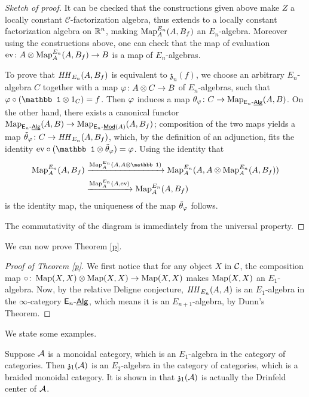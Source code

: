 \documentclass[twoside]{article}
\begin{document}
\begin{proof}[Sketch of proof]
    It can be checked that the constructions given above make $Z$ a 
    locally constant $\mathscr C$-factorization algebra, thus extends to a locally
    constant factorization algebra on $\mathbb{R}^n$, making $\operatorname{Map}_A^{E_n}(A,B_f)$ an
    $E_n$-algebra. Moreover using the constructions above,
    one can check that the map of evaluation
    $\mathrm{ev}\colon A\otimes\operatorname{Map}_A^{E_n}(A,B_f)\to B$ is a map of $E_n$-algebras.

    To prove that $\mathit{HH}_{E_n}(A,B_f)$ is equivalent to $\mathfrak z_n(f)$, we choose
    an arbitrary $E_n$-algebra $C$ together with a map $\varphi\colon A\otimes C\to B$ of 
    $E_n$-algebras, such that $\vp\circ(\mathbb1\ox 1_{C})=f$. Then $\varphi$
    induces a map $\theta_\varphi\colon C\to\operatorname{Map}_{\mathsf{E}_n\text{-}\underline{\smash{\mathsf{Alg}}}}(A,B)$. On the other hand, there
    exists a canonical functor $\operatorname{Map}_{\mathsf{E}_n\text{-}\underline{\smash{\mathsf{Alg}}}}(A,B)\to
    \operatorname{Map}_{\mathsf{E}_n\text{-}\underline{\smash{\mathsf{Mod}}}(A)}(A,B_f)$; composition of the two maps yields a map 
    $\tilde\theta_\varphi\colon C\to\mathit{HH}_{E_n}(A,B_f)$, which, by the definition of
    an adjunction, fits the identity $\mathrm{ev}\circ(\mathbb1\ox\tilde\theta_\vp)
    =\vp$. Using the identity that $$\begin{aligned}\Map_A^{E_n}(A,B_f)
    &\xrightarrow{\Map_A^{E_n}(A,A\ox\mathbb1)}
    \Map_A^{E_n}(A,A\ox\Map_A^{E_n}(A,B_f))\\&\xrightarrow{\Map_A^{E_n}(A,\mathrm{ev})}
    \Map_A^{E_n}(A,B_f)\end{aligned}$$ is the identity map, the uniqueness of the map
    $\tilde\theta_\varphi$ follows.

    The commutativity of the diagram is immediately from the universal property.
\end{proof}

We can now prove Theorem \ref{p}.

\begin{proof}[Proof of Theorem \ref{p}]
    We first notice that for any object $X$ in $\cal C$, the composition map
    $\circ\colon\operatorname{Map}(X,X)\otimes\operatorname{Map}(X,X)\to\operatorname{Map}(X,X)$
    makes $\operatorname{Map}(X,X)$ an $E_1$-algebra. Now, by the relative Deligne conjecture,
    $\mathit{HH}_{E_n}(A,A)$ is an $E_1$-algebra in the $\infty$-category $\mathsf{E}_n\text{-}\underline{\smash{\mathsf{Alg}}}$,
    which means it is an $E_{n+1}$-algebra, by Dunn's Theorem.
\end{proof}

We state some examples.

\begin{example}
    Suppose $\cal A$ is a monoidal category, which is an $E_1$-algebra in
    the category of categories. Then $\mathfrak z_1(\cal A)$ is an $E_2$-algebra in
    the category of categories, which is a braided monoidal category. It is shown
    in \cite{Lur16} that $\mathfrak z_1(\cal A)$ is actually the Drinfeld center
    of $\cal A$.
\end{example}
\end{document}
